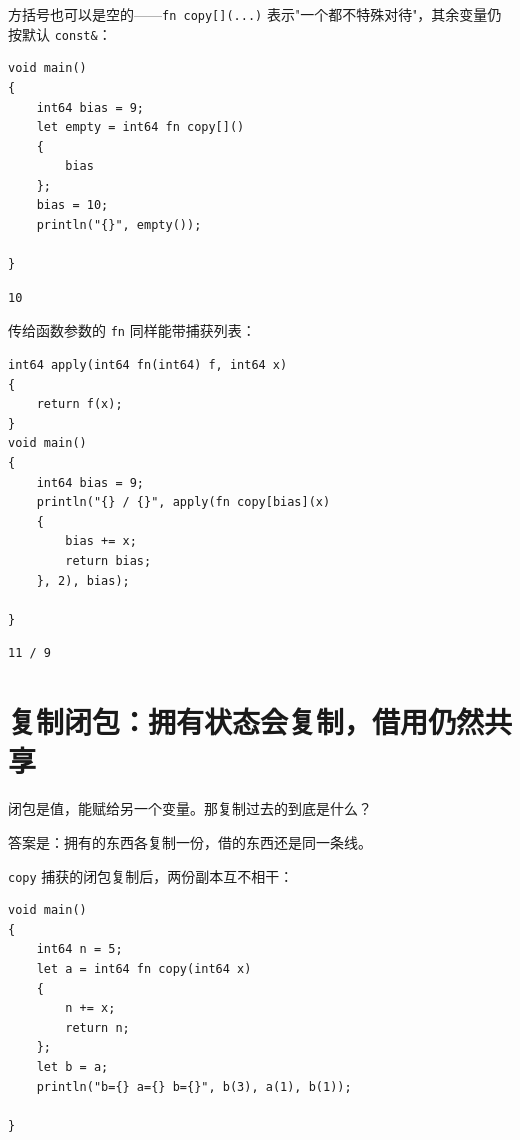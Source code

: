 方括号也可以是空的——\texttt{fn copy[\allowbreak{}]\allowbreak{}(\allowbreak{}.\allowbreak{}.\allowbreak{}.\allowbreak{})\allowbreak{}} 表示"一个都不特殊对待"，其余变量仍按默认 \texttt{const\&}：

\par
\medskip
\begin{lstlisting}[style=chali]
void main()
{
    int64 bias = 9;
    let empty = int64 fn copy[]()
    {
        bias
    };
    bias = 10;
    println("{}", empty());

}
\end{lstlisting}
\par
\medskip

\par
\medskip
\begin{lstlisting}[style=out]
10
\end{lstlisting}
\par
\medskip

传给函数参数的 \texttt{fn} 同样能带捕获列表：

\par
\medskip
\begin{lstlisting}[style=chali]
int64 apply(int64 fn(int64) f, int64 x)
{
    return f(x);
}
void main()
{
    int64 bias = 9;
    println("{} / {}", apply(fn copy[bias](x)
    {
        bias += x;
        return bias;
    }, 2), bias);

}
\end{lstlisting}
\par
\medskip

\par
\medskip
\begin{lstlisting}[style=out]
11 / 9
\end{lstlisting}
\par
\medskip

\section{复制闭包：拥有状态会复制，借用仍然共享}

闭包是值，能赋给另一个变量。那复制过去的到底是什么？

答案是：拥有的东西各复制一份，借的东西还是同一条线。

\texttt{copy} 捕获的闭包复制后，两份副本互不相干：

\par
\medskip
\begin{lstlisting}[style=chali]
void main()
{
    int64 n = 5;
    let a = int64 fn copy(int64 x)
    {
        n += x;
        return n;
    };
    let b = a;
    println("b={} a={} b={}", b(3), a(1), b(1));

}
\end{lstlisting}
\par
\medskip

